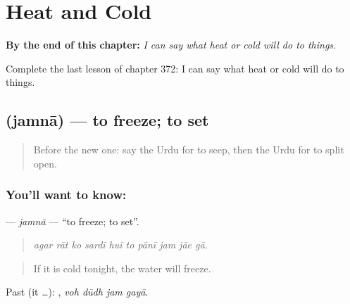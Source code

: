 
\chapter{Heat and Cold}
\label{ch:ur-heat-and-cold}

\begin{chapteropening}
\textbf{By the end of this chapter:} \emph{I can say what heat or cold will do to things.}

Complete the last lesson of chapter 372: I can say what heat or cold will do to things.
\end{chapteropening}

\section[\texorpdfstring{\ur{جمنا} (jamnā)}{جمنا (jamnā)}]{ (jamnā) — to freeze; to set}

\label{lesson:UR-C372-jamna}



\begin{quote}
Before the new one: say the Urdu for to seep, then the Urdu for to split open.
\end{quote}

\subsection*{You'll want to know: }
\textbf{} — \emph{jamnā} — \textquotedblleft{}to freeze; to set\textquotedblright{}.

\begin{quote}
         
\end{quote}

\begin{quote}
\emph{agar rāt ko sardī huī to pānī jam jāe gā.}
\end{quote}

\begin{quote}
If it is cold tonight, the water will freeze.
\end{quote}

Past (it …):    , \emph{voh dūdh jam gayā}.

